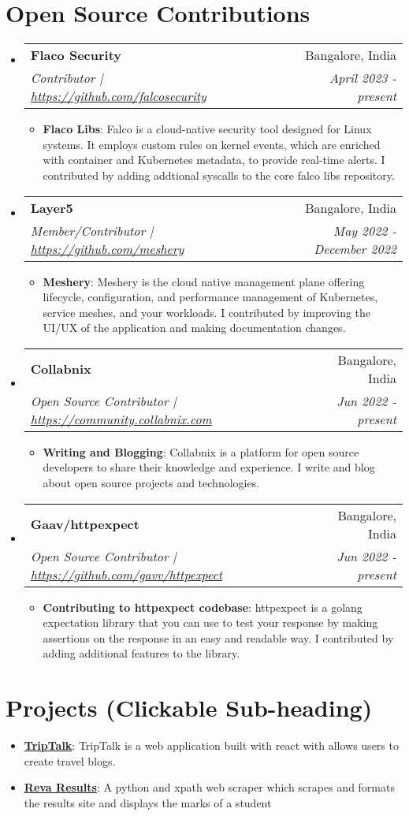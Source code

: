 \documentclass[letterpaper,11pt]{article}
\makeatletter
\newcommand{\resumeItem}[2]{
  \item\small{
    \textbf{#1}{: #2 \vspace{-2pt}}
  }
}
\newcommand{\resumeSubheading}[4]{
  \vspace{-1pt}\item
    \begin{tabular*}{0.97\textwidth}{l@{\extracolsep{\fill}}r}
      \textbf{#1} & #2 \\
      \textit{\small#3} & \textit{\small #4} \\
    \end{tabular*}\vspace{-5pt}
}
\newcommand{\resumeSubItem}[2]{\resumeItem{#1}{#2}\vspace{-4pt}}
\newcommand{\resumeSubHeadingListStart}{\begin{itemize}[leftmargin=*]}
\newcommand{\resumeSubHeadingListEnd}{\end{itemize}}
\newcommand{\resumeItemListStart}{\begin{itemize}}
\newcommand{\resumeItemListEnd}{\end{itemize}\vspace{-5pt}}
\makeatother
\begin{document}
\section{Open Source Contributions}  
\resumeSubHeadingListStart
\resumeSubheading
  {Flaco Security }{Bangalore, India}
  {Contributor | \href{https://github.com/falcosecurity}{https://github.com/falcosecurity}}{April 2023 - present}
  \resumeItemListStart
  \resumeItem{Flaco Libs} 
   {Falco is a cloud-native security tool designed for Linux systems. It employs custom rules on kernel events, which are enriched with container and Kubernetes metadata, to provide real-time alerts.
  I contributed by adding addtional syscalls to the core falco libs repository.}
\resumeItemListEnd
  \resumeSubheading
  {Layer5}{Bangalore, India}
  {Member/Contributor | \href{https://github.com/meshery}{https://github.com/meshery} }{May 2022 - December 2022}
  \resumeItemListStart
  \resumeItem{Meshery}
  {Meshery is the cloud native management plane offering lifecycle, configuration, and performance management of Kubernetes, service meshes, and your workloads. I contributed by improving the UI/UX of the application and making documentation changes.}
\resumeItemListEnd
\resumeSubheading
  {Collabnix  }{Bangalore, India}
  {Open Source Contributor | \href{https://community.collabnix.com}{https://community.collabnix.com}}{Jun 2022 - present}
  \resumeItemListStart
  \resumeItem{Writing and Blogging}
  {Collabnix is a platform for open source developers to share their knowledge and experience. I write and blog about open source projects and technologies.}
\resumeItemListEnd 
\resumeSubheading
  {Gaav/httpexpect}{Bangalore, India}
  {Open Source Contributor | \href{https://github.com/gavv/httpexpect}{https://github.com/gavv/httpexpect}}{Jun 2022 - present}
  \resumeItemListStart
  \resumeItem{Contributing to httpexpect codebase}
  {httpexpect is a golang expectation library that you can use to test your response by making assertions on the response in an easy and readable way.
  I contributed by adding additional features to the library.}
\resumeItemListEnd 
\resumeSubHeadingListEnd
\section{Projects (Clickable Sub-heading)}
  \resumeSubHeadingListStart
    \resumeSubItem{\href{https://triptalk-production.web.app/home}{TripTalk}}
      {TripTalk is a  web application built with react with allows users to create travel blogs.}
    \resumeSubItem{\href{https://github.com/rohith-raju/Reva-results}{Reva Results}}
    {
    A python and xpath web scraper which scrapes and formats the results site and displays the marks of a student 
    }
  \resumeSubHeadingListEnd
\end{document}
